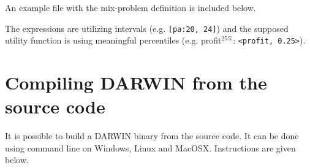 An example file with the mix-problem definition is included below.



The expressions are utilizing intervals (e.g. \texttt{[pa:20, 24]}) and the
supposed utility function is using meaningful percentiles
(e.g. profit$^{25\%}$: \texttt{<profit, 0.25>}).



\section*{Compiling DARWIN from the source code}

It is possible to build a DARWIN binary from the source code. It can be done
using command line on Windows, Linux and MacOSX.  Instructions are given
below.

